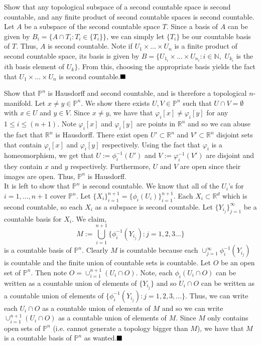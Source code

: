 \documentclass[12pt]{article}
\begin{document}
\begin{ExerciseList}
  \Exercise
  	Show that any topological subspace of a second countable space is second countable, and any finite product of second countable spaces is second countable.
  \Answer
  	 Let $A$ be a subspace of the second countable space $T$. Since a basis of $A$ can be given by $B_i
        = \{A \cap T_i: T_i\in\{T_i\}\}$, we can simply let $\{T_i\}$ be our countable basis of $T$. Thus, $A$ is second countable.
        Note if $U_1\times\hdots\times U_n$ is a finite product of second countable space, its basis is given by
        $B = \{U_{1_i}\times\hdots\times U_{n_i}: i\in\mathbb{N},$ $U_{k_i}$ is the $i$th basis element of $U_k\}$. 
        From this, choosing the appropriate basis yields the fact that $U_1\times\hdots\times U_n$ is second countable.$\hfill\blacksquare$
  
  \Exercise
  	Show that $\mathbb{P}^n$ is Hausdorff and second countable, and is therefore a topological $n$-manifold.
  \Answer
  	Let $x\neq y\in \mathbb{P}^n$. We show there exists $U,V\in\mathbb{P}^n$ such that $U\cap V=\emptyset$ with $x\in U$ and $y\in V$. Since $x\neq y$, we have that $\varphi_i[x]\neq \varphi_i[y]$
	for any $1\leq i\leq (n+1)$. Note $\varphi_i[x]$ and $\varphi_i[y]$ are points in $\mathbb{R}^n$ and so we can abuse the fact that $\mathbb{R}^n$ is Hausdorff. There exist open $U'\subset\mathbb{R}^n$
	 and $V'\subset\mathbb{R}^n$ disjoint sets that contain $\varphi_i[x]$ and $\varphi_i[y]$ respectively. Using the fact that $\varphi_i$ is a homeomorphism, we get that $U := \phi_i^{-1}(U')$ and 
	 $V := \varphi_i^{-1}(V')$ are disjoint and they contain $x$ and $y$ respectively. Furthermore, $U$ and $V$ are open since their images are open. Thus, $\mathbb{P}^n$ is Hausdorff.\\
	 
	 It is left to show that $\mathbb{P}^n$ is second countable. We know that all of the $U_i$'s for $i = 1,\hdots,n+1$ cover $\mathbb{P}^n$. Let $\{X_i\}_{i=1}^{n+1} = \{\phi_i(U_i)\}_{i=1}^{n+1}$.
	 Each $X_i\subset\mathbb{R}^d$ which is second countable, so each $X_i$ as a subspace is second countable. Let $\{Y_{i_j}\}_{j=1}^{\infty}$ be a countable basis for $X_i$.
	 We claim,
	 \[ M := \bigcup_{i=1}^{n+1} \{\phi_i^{-1}(Y_{i_j}): j=1,2,3\hdots\}\]
	 is a countable basis of $\mathbb{P}^n$. Clearly $M$ is countable because each $\cup_{j=1}^{\infty} \phi_i^{-1}(Y_{i_j})$ is countable and the finite union of countable sets is countable. Let
	 $O$ be an open set of $\mathbb{P}^n$. Then note $O = \cup_{i=1}^{n+1} (U_i\cap O)$. Note, each $\phi_i(U_i\cap O)$ can be written as a countable union of elements of $\{Y_{i_j}\}$ and so
	 $U_i\cap O$ can be written as a countable union of elements of $\{\phi_i^{-1}(Y_{i_j}): j=1,2,3,\hdots\}$. Thus, we can write each $U_i\cap O$ as a countable union of elements of $M$ and so
	 we can write $\cup_{i=1}^{n+1} (U_i\cap O)$ as a countable union of elements of $M$. Since $M$ only contains open sets of $\mathbb{P}^n$ (i.e. cannot generate a topology bigger than $M$), 
	 we have that $M$ is a countable basis of $\mathbb{P}^n$ as wanted.$\hfill\blacksquare$
	 

\end{ExerciseList}
\end{document}
